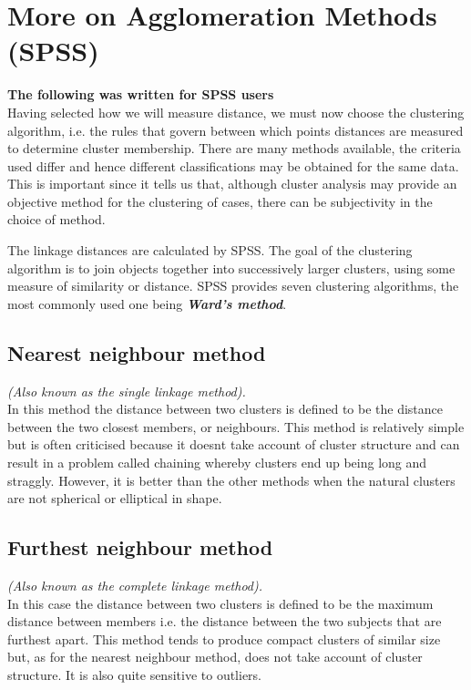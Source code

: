 \documentclass[SKLCluster.tex]{subfiles}
\begin{document}
\section{More on Agglomeration Methods (SPSS)}
\textbf{The following was written for SPSS users} \\
Having selected how we will measure distance, we must now choose the clustering algorithm, i.e. the rules that govern between which points distances are measured to determine cluster membership. There are many methods available, the criteria used differ and hence
different classifications may be obtained for the same data. This is important since it tells us that, although cluster analysis may provide an objective method for the clustering of cases, there can be subjectivity in the choice of method. 

The linkage distances are calculated by SPSS. The goal of the clustering algorithm is to join objects together into successively larger clusters, using some measure of similarity or distance. SPSS provides seven clustering algorithms, the most commonly used one being  \textbf{\textit{Ward's method}}.


\subsection{Nearest neighbour method} \textit{
(Also known as the single linkage method).\\}
In this method the distance between two clusters is defined to be the distance between
the two closest members, or neighbours. This method is relatively simple but is often
criticised because it doesnt take account of cluster structure and can result in a problem
called chaining whereby clusters end up being long and straggly. However, it is better
than the other methods when the natural clusters are not spherical or elliptical in shape.

\subsection{Furthest neighbour method}\textit{
(Also known as the complete linkage method).\\}
In this case the distance between two clusters is defined to be the maximum distance
between members  i.e. the distance between the two subjects that are furthest apart.
This method tends to produce compact clusters of similar size but, as for the nearest
neighbour method, does not take account of cluster structure. It is also quite sensitive
to outliers.
\end{document}
